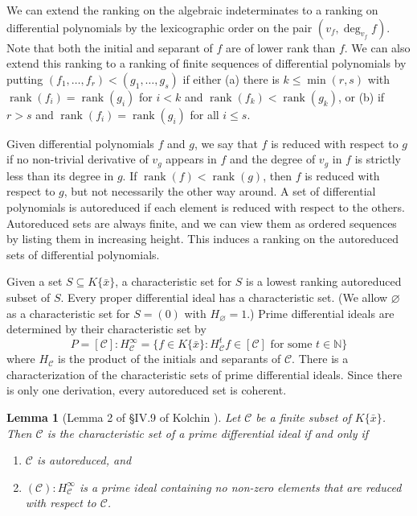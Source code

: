 \documentclass[12pt]{amsart}
\newtheorem{lemma}[theorem]{Lemma}
\theoremstyle{definition}
\numberwithin{subcase}{cases}
\theoremstyle{remark}
\newcommand{\mc}[1]{\mathcal{#1}}
\DeclareMathOperator{\rank}{rank}
\begin{document}
We can extend the ranking on the algebraic indeterminates to a ranking on differential polynomials by the lexicographic order on the pair $(v_f,\deg_{v_f} f)$. Note that both the initial and separant of $f$ are of lower rank than $f$. We can also extend this ranking to a ranking of finite sequences of differential polynomials by putting $(f_1,\ldots,f_r) < (g_1,\ldots,g_s)$ if either (a) there is $k \leq \min(r,s)$ with $\rank(f_i) = \rank(g_i)$ for $i < k$ and $\rank(f_k) < \rank(g_k)$, or (b) if $r > s$ and $\rank(f_i) = \rank(g_i)$ for all $i \leq s$.

Given differential polynomials $f$ and $g$, we say that $f$ is reduced with respect to $g$ if no non-trivial derivative of $v_g$ appears in $f$ and the degree of $v_g$ in $f$ is strictly less than its degree in $g$. If $\rank(f) < \rank(g)$, then $f$ is reduced with respect to $g$, but not necessarily the other way around. A set of differential polynomials is autoreduced if each element is reduced with respect to the others. Autoreduced sets are always finite, and we can view them as ordered sequences by listing them in increasing height. This induces a ranking on the autoreduced sets of differential polynomials.

Given a set $S \subseteq K\{\bar{x}\}$, a characteristic set for $S$ is a lowest ranking autoreduced subset of $S$. Every proper differential ideal has a characteristic set. (We allow $\varnothing$ as a characteristic set for $S = (0)$ with $H_\varnothing = 1$.) Prime differential ideals are determined by their characteristic set by
\[ P = [\mc{C}] : H_\mc{C}^\infty  = \{ f \in K\{\bar{x}\} : \text{$H_{\mc{C}}^t f \in [\mc{C}]$ for some $t \in \mathbb{N}$} \}\]
where $H_{\mc{C}}$ is the product of the initials and separants of $\mc{C}$. There is a characterization of the characteristic sets of prime differential ideals. Since there is only one derivation, every autoreduced set is coherent.%

\begin{lemma}[Lemma 2 of \S IV.9 of Kolchin \cite{Kolchin73}]\label{char-of-being-char-set}
    Let $\mc{C}$ be a finite subset of $K\{\bar{x}\}$. Then $\mc{C}$ is the characteristic set of a prime differential ideal if and only if
    \begin{enumerate}
        \item $\mc{C}$ is autoreduced, and
        \item $(\mc{C}) : H_\mc{C}^\infty$ is a prime ideal containing no non-zero elements that are reduced with respect to $\mc{C}$.
    \end{enumerate}
\end{lemma}
\end{document}
